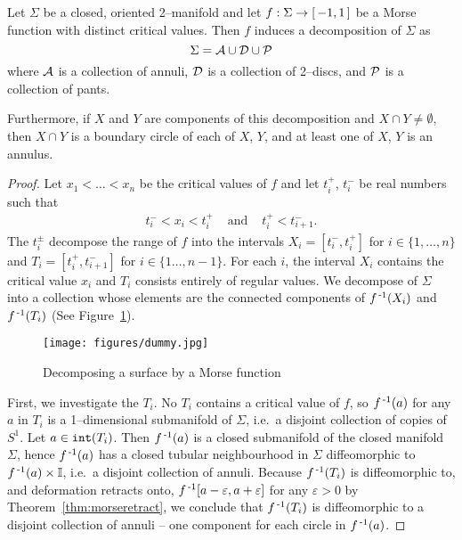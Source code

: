 \begin{lem}
	\label{lem:sigmadecomp}
	Let $\Sigma$ be a closed, oriented 2--manifold and let $f:\Sigma\to[\,-1,1\,]$ be a Morse function with distinct critical values.
	Then $f$ induces a decomposition of $\Sigma$ as
	\[
		\Sigma=\mathcal{A}\cup \mathcal{D}\cup \mathcal{P}
	\]
	where $\mathcal{A}$ is a collection of annuli, $\mathcal{D}$ is a collection of 2--discs, and $\mathcal{P}$ is a collection of pants.
	
	Furthermore, if $X$ and $Y$ are components of this decomposition and $X\cap Y\neq\emptyset$, then $X\cap Y$ is a boundary circle of each of $X$, $Y$, and at least one of $X$, $Y$ is an annulus.
\end{lem}

\begin{proof}
	Let $x_1<\dots<x_n$ be the critical values of $f$ and let $t_i^+$, $t_i^-$ be real numbers such that
	\[
		\begin{array}{ccc}
			t_i^-<x_i<t_i^+ & \textrm{ and } & t_i^+<t_{i+1}^-. 		
		\end{array}
	\]
	The $t_i^\pm$ decompose the range of $f$ into the intervals $X_i=[t_i^-,t_i^+]$ for $i\in\{1,\dots,n\}$ and $T_i=[t_i^+,t_{i+1}^-]$ for $i\in\{1\dots, n-1\}$.
	For each $i$, the interval $X_i$ contains the critical value $x_i$ and $T_i$ consists entirely of regular values.
	We decompose of $\Sigma$ into a collection whose elements are the connected components of $f^{\,\text{-}1}(X_i)$ and $f^{\,\text{-}1}(T_i)$ (See Figure~\ref{fig:sigmadecomp}).
	
	\begin{figure}
		\centering
		\caption{Decomposing a surface by a Morse function}
		\texttt{[image: figures/dummy.jpg]}
		\label{fig:sigmadecomp}
	\end{figure}
		
	First, we investigate the $T_i$.
	No $T_i$ contains a critical value of $f$, so $f^{\,\text{-}1}(a)$ for any $a$ in $T_i$ is a 1--dimensional submanifold of $\Sigma$, i.e.\ a disjoint collection of copies of $S^1$.
	Let $a\in\mathtt{int}(T_i)$.
	Then $f^{\,\text{-}1} (a)$ is a closed submanifold of the closed manifold $\Sigma$, hence $f^{\,\text{-}1}(a)$ has a closed tubular neighbourhood in $\Sigma$ diffeomorphic to $f^{\,\text{-}1} (a)\times \mathbb{I}$, i.e.\ a disjoint collection of annuli.
	Because $f^{\,\text{-}1}(T_i)$ is diffeomorphic to, and deformation retracts onto, $f^{\,\text{-}1}[a-\varepsilon,a+\varepsilon]$ for any $\varepsilon>0$ by Theorem~\ref{thm:morseretract}, we conclude that $f^{\,\text{-}1}(T_i)$ is diffeomorphic to a disjoint collection of annuli -- one component for each circle in $f^{\,\text{-}1}(a)$.
	

\end{proof}
